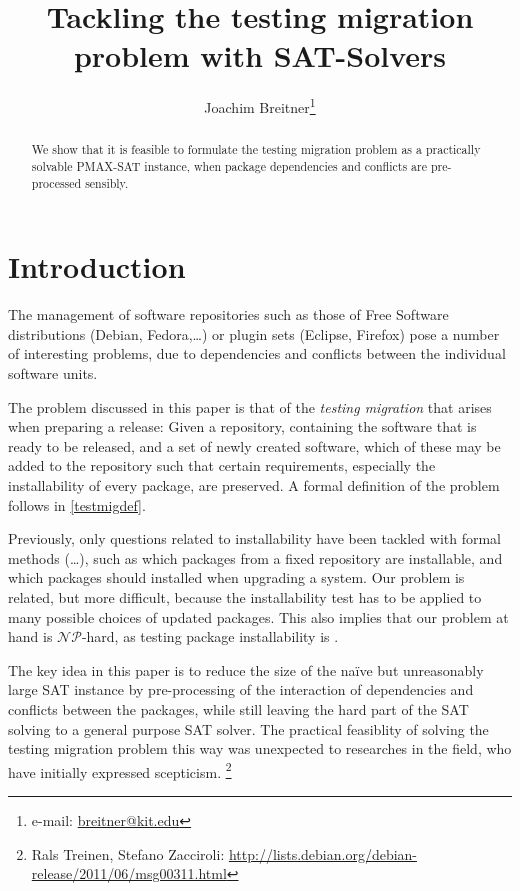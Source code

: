 \documentclass[halfparskip,11pt]{scrartcl}
\author{Joachim Breitner\footnote{e-mail: \href{mailto:breitner@kit.edu}{breitner@kit.edu}}}
\title{Tackling the testing migration problem with SAT-Solvers}
\begin{document}
\maketitle



\begin{abstract}
We show that it is feasible to formulate the testing migration problem as a practically solvable PMAX-SAT instance, when package dependencies and conflicts are pre-processed sensibly.
\end{abstract}


\section{Introduction}

The management of software repositories such as those of Free Software distributions (Debian, Fedora,\dots) or plugin sets (Eclipse, Firefox) pose a number of interesting problems, due to dependencies and conflicts between the individual software units.

The problem discussed in this paper is that of the \emph{testing migration} that arises when preparing a release: Given a repository, containing the software that is ready to be released, and a set of newly created software, which of these may be added to the repository such that certain requirements, especially the installability of every package, are preserved. A formal definition of the problem follows in \ref{testmigdef}.

Previously, only questions related to installability have been tackled with formal methods (\cite{edos}\dots), such as which packages from a fixed repository are installable, and which packages should installed when upgrading a system. Our problem is related, but more difficult, because the installability test has to be applied to many possible choices of updated packages. This also implies that our problem at hand is $\mathcal{NP}$-hard, as testing package installability is \cite{burrows}.

The key idea in this paper is to reduce the size of the naïve but unreasonably large SAT instance by pre-processing of the interaction of dependencies and conflicts between the packages, while still leaving the hard part of the SAT solving to a general purpose SAT solver. The practical feasiblity of solving the testing migration problem this way was unexpected to researches in the field, who have initially expressed scepticism. \footnote{Rals Treinen, Stefano Zacciroli: \url{http://lists.debian.org/debian-release/2011/06/msg00311.html}}
\end{document}
